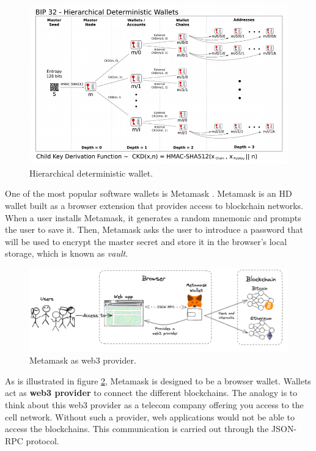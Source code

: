 \begin{figure}[H]
\centering
\includegraphics[width=14cm]{img/chapter_2/hierarchical-deterministic-wallet.png}
\caption[Hierarchical deterministic wallet]{\footnotesize{Hierarchical deterministic wallet.}}
\label{fig:hierarchical-deterministic-wallet}
\end{figure}

{One of the most popular software wallets is Metamask \cite{metamask}. Metamask is an HD wallet built as a browser extension that provides access to blockchain networks. When a user installs Metamask, it generates a random mnemonic and prompts the user to save it. Then, Metamask asks the user to introduce a password that will be used to encrypt the master secret and store it in the browser's local storage, which is known as \textit{vault}.


\begin{figure}[H]
\centering
\includegraphics[width=14cm]{img/chapter_2/metamask-provider.png}
\caption[Metamask as web3 provider]{\footnotesize{Metamask as web3 provider.}}
\label{fig:metamask-mnemonic}
\end{figure}

As is illustrated in figure \ref{fig:metamask-mnemonic}, Metamask is designed to be a browser wallet. Wallets act as \textbf{web3 provider} to connect the different blockchains. The analogy is to think about this web3 provider as a telecom company offering you access to the cell network. Without such a provider, web applications would not be able to access the blockchains. This communication is carried out through the JSON-RPC protocol.}
